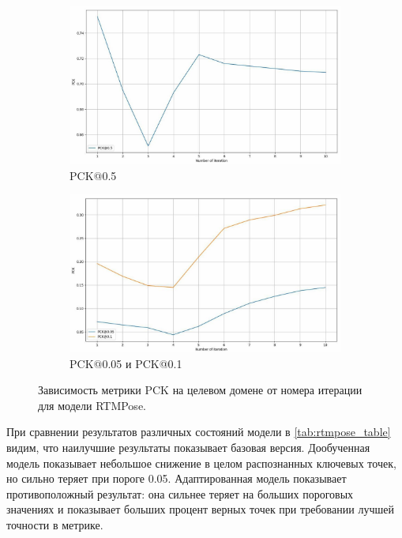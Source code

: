 \begin{figure}[H]
\centering
\begin{subfigure}{.95\textwidth}
	\centering
	\includegraphics[width=\textwidth]{./images/results/rtmpose/rtmpose_pck}
	\caption{PCK@0.5}
	\label{fig:rtmpose_pck_05}
\end{subfigure}
\begin{subfigure}{.95\textwidth}
	\centering
	\includegraphics[width=\textwidth]{./images/results/rtmpose/rtmpose_pck_small}
	\caption{PCK@0.05 и PCK@0.1}
	\label{fig:rtmpose_pck_small}
\end{subfigure}
\caption{Зависимость метрики PCK на целевом домене от номера итерации для модели RTMPose.}
\label{fig:rtmpose_pck}
\end{figure}

При сравнении результатов различных состояний модели в \autoref{tab:rtmpose_table} видим, что наилучшие результаты показывает базовая версия. Дообученная модель показывает небольшое снижение в целом распознанных ключевых точек, но сильно теряет при пороге 0.05. Адаптированная модель показывает противоположный результат: она сильнее теряет на больших пороговых значениях и показывает больших процент верных точек при требовании лучшей точности в метрике.

